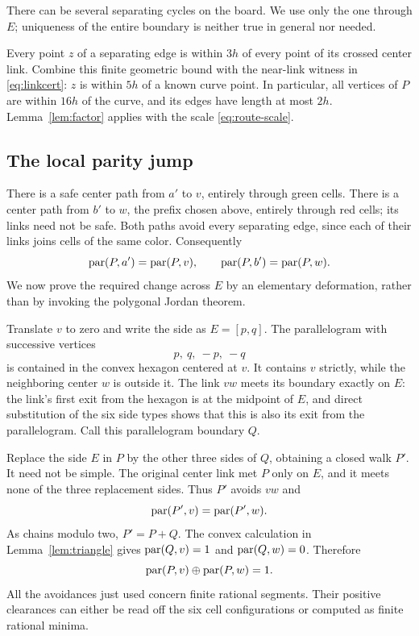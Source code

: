 There can be several separating cycles on the board. We use only
the one through $E$; uniqueness of the entire boundary is neither
true in general nor needed.

Every point $z$ of a separating edge is within $3h$ of every
point of its crossed center link. Combine this finite geometric
bound with the near-link witness in \eqref{eq:linkcert}: $z$ is
within $5h$ of a known curve point. In particular, all vertices of
$P$ are within $16h$ of the curve, and its edges have length at
most $2h$. Lemma~\ref{lem:factor} applies with the scale
\eqref{eq:route-scale}.

\subsection{The local parity jump}

There is a safe center path from $a'$ to $v$, entirely through
green cells. There is a center path from $b'$ to $w$, the prefix
chosen above, entirely through red cells; its links need not be
safe. Both paths avoid every separating edge, since each of
their links joins cells of the same color. Consequently
\begin{equation}
 \operatorname{par}(P,a')=\operatorname{par}(P,v),\qquad
 \operatorname{par}(P,b')=\operatorname{par}(P,w).
 \label{eq:samecycle}
\end{equation}
We now prove the required change across $E$ by an elementary
deformation, rather than by invoking the polygonal Jordan theorem.

Translate $v$ to zero and write the side as $E=[p,q]$.
The parallelogram with successive vertices
\[
                  p,\ q,\ -p,\ -q
\]
is contained in the convex hexagon centered at $v$.
It contains $v$ strictly, while the neighboring center $w$ is
outside it. The link $vw$ meets its boundary exactly on $E$:
the link's first exit from the hexagon is at the midpoint of $E$,
and direct substitution of the six side types shows that this
is also its exit from the parallelogram.
Call this parallelogram boundary $Q$.

Replace the side $E$ in $P$ by the other three sides of $Q$,
obtaining a closed walk $P'$. It need not be simple.
The original center link met $P$ only on $E$, and it meets none
of the three replacement sides. Thus $P'$ avoids $vw$ and
\[
                  \operatorname{par}(P',v)=\operatorname{par}(P',w).
\]
As chains modulo two, $P'=P+Q$. The convex calculation in
Lemma~\ref{lem:triangle} gives $\operatorname{par}(Q,v)=1$ and
$\operatorname{par}(Q,w)=0$. Therefore
\begin{equation}
                  \operatorname{par}(P,v)\mathbin{\oplus}\operatorname{par}(P,w)=1.
 \label{eq:jump}
\end{equation}
All the avoidances just used concern finite rational segments.
Their positive clearances can either be read off the six cell
configurations or computed as finite rational minima.

